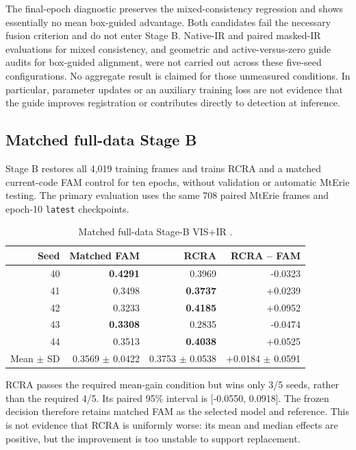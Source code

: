 The final-epoch diagnostic preserves the mixed-consistency regression and
shows essentially no mean box-guided advantage. Both candidates fail the
necessary fusion criterion and do not enter Stage B. Native-IR and
paired masked-IR evaluations for mixed consistency, and geometric and
active-versus-zero guide audits for box-guided alignment, were not carried
out across these five-seed configurations. No aggregate result is claimed
for those unmeasured conditions. In particular, parameter updates or an
auxiliary training loss are not evidence that the guide improves registration
or contributes directly to detection at inference.

\subsection{Matched full-data Stage B}

Stage B restores all 4,019 training frames and trains RCRA and a matched
current-code FAM control for ten epochs, without validation or automatic
MtErie testing.
The primary evaluation uses the same 708 paired MtErie frames and epoch-10
\texttt{latest} checkpoints.

\begin{table}[htbp]
  \centering
  \caption{Matched full-data Stage-B VIS+IR \mapfifty{}.}
  \label{tab:stage-b-rcra}
  \begin{tabular}{rrrr}
    \toprule
    Seed & Matched FAM & RCRA & RCRA -- FAM \\
    \midrule
    40 & \textbf{0.4291} & 0.3969 & -0.0323 \\
    41 & 0.3498 & \textbf{0.3737} & +0.0239 \\
    42 & 0.3233 & \textbf{0.4185} & +0.0952 \\
    43 & \textbf{0.3308} & 0.2835 & -0.0474 \\
    44 & 0.3513 & \textbf{0.4038} & +0.0525 \\
    \midrule
    Mean \(\pm\) SD
      & 0.3569 \(\pm\) 0.0422
      & 0.3753 \(\pm\) 0.0538
      & +0.0184 \(\pm\) 0.0591 \\
    \bottomrule
  \end{tabular}
\end{table}

RCRA passes the required mean-gain condition but wins only 3/5 seeds, rather
than the required 4/5. Its paired 95\% interval is
[-0.0550, 0.0918]. The frozen decision therefore retains matched FAM as the
selected model and reference. This is not evidence that RCRA is uniformly worse:
its mean and median effects are positive, but the improvement is too unstable
to support replacement.


